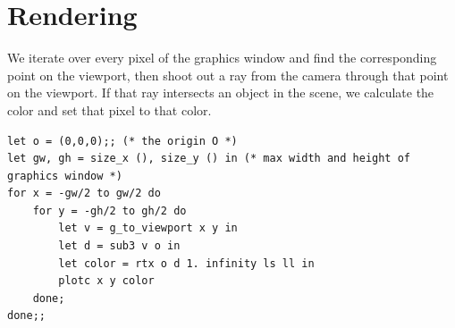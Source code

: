 \documentclass{article}
\begin{document}
\section{Rendering}

We iterate over every pixel of the graphics window and find the corresponding point on the viewport, then shoot out a ray from the camera through that point on the viewport. If that ray intersects an object in the scene, we calculate the color and set that pixel to that color.

\begin{verbatim}
let o = (0,0,0);; (* the origin O *)
let gw, gh = size_x (), size_y () in (* max width and height of graphics window *)
for x = -gw/2 to gw/2 do 
    for y = -gh/2 to gh/2 do 
        let v = g_to_viewport x y in
        let d = sub3 v o in
        let color = rtx o d 1. infinity ls ll in 
        plotc x y color
    done;
done;;
\end{verbatim}
\end{document}
